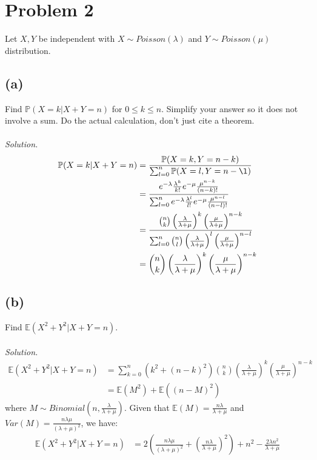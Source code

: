 \documentclass{article}
\newcommand{\prob}{\mathbb{P}}
\newcommand{\E}{\mathbb{E}}
\begin{document}
\section*{Problem 2}
Let $X,Y$ be independent with $X \sim Poisson(\lambda)$ and $Y \sim Poisson(\mu)$ distribution.
\subsection*{(a)}
Find $\prob(X=k|X+Y=n)$ for $ 0\leq k \leq n$. Simplify your answer so it does not involve a sum. Do the actual calculation, don't just cite a theorem.\\\\
\color{blue}
\textit{Solution. }
\begin{equation*}
    \begin{split}
        \prob(X=k|X+Y=n) &= \frac{\prob(X=k,Y=n-k)}{\sum_{l=0}^{n}\prob(X=l,Y=n-\l)}\\
            &= \frac{e^{-\lambda}\frac{\lambda^k}{k!}e^{-\mu}\frac{\mu^{n-k}}{(n-k)!}}{\sum_{l=0}^ne^{-\lambda}\frac{\lambda^l}{l!}e^{-\mu}\frac{\mu^{n-l}}{(n-l)!}}\\
            &= \frac{{n \choose k}\left(\frac{\lambda}{\lambda+\mu}\right)^k\left(\frac{\mu}{\lambda+\mu}\right)^{n-k}}{\sum_{l=0}^n{n \choose l} \left(\frac{\lambda}{\lambda+\mu}\right)^l \left( \frac{\mu}{\lambda+\mu} \right) ^{n-l}} \\
            &= {n \choose k}\left(\frac{\lambda}{\lambda+\mu}\right)^k\left(\frac{\mu}{\lambda+\mu}\right)^{n-k}
    \end{split}
\end{equation*}
\color{black}
\subsection*{(b)}
Find $\E(X^2+Y^2|X+Y=n)$.\\\\
\color{blue}
\textit{Solution. }
\begin{equation*}
\begin{split}
    \E(X^2+Y^2|X+Y=n) &= \sum_{k=0}^n(k^2+(n-k)^2){n \choose k} \left(\frac{\lambda}{\lambda+\mu}\right)^k\left(\frac{\mu}{\lambda+\mu}\right)^{n-k}\\
        &=\E(M^2)+\E((n-M)^2)
\end{split}
\end{equation*}
where $M \sim Binomial(n,\frac{\lambda}{\lambda+\mu})$. Given that $\E(M) = \frac{n\lambda}{\lambda+\mu}$ and $Var(M) = \frac{n\lambda \mu}{(\lambda+\mu)^2}$, we have:
\begin{equation*}
    \begin{split}
        \E(X^2+Y^2|X+Y=n) &= 2\left(\frac{n\lambda \mu}{(\lambda+\mu)^2}+\left(\frac{n\lambda}{\lambda+\mu}\right)^2\right)+n^2-\frac{2\lambda n^2}{\lambda+\mu}
    \end{split}
\end{equation*}
\color{black}
\end{document}
